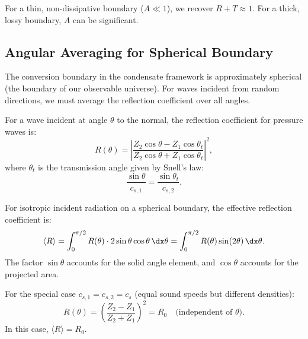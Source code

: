 For a thin, non-dissipative boundary ($A \ll 1$), we recover $R + T \approx 1$. For a thick, lossy boundary, $A$ can be significant.

\subsection{Angular Averaging for Spherical Boundary}
\label{app:angular_averaging}

The conversion boundary in the condensate framework is approximately spherical (the boundary of our observable universe). For waves incident from random directions, we must average the reflection coefficient over all angles.

\begin{proposition}
\label{prop:oblique_R}
For a wave incident at angle $\theta$ to the normal, the reflection coefficient for pressure waves is:
\begin{equation}
\label{eq:oblique_R}
R(\theta) = \left| \frac{Z_2 \cos\theta - Z_1 \cos\theta_t}{Z_2 \cos\theta + Z_1 \cos\theta_t} \right|^2,
\end{equation}
where $\theta_t$ is the transmission angle given by Snell's law:
\begin{equation}
\frac{\sin\theta}{c_{s,1}} = \frac{\sin\theta_t}{c_{s,2}}.
\end{equation}
\end{proposition}

\begin{proposition}
\label{prop:angular_average}
For isotropic incident radiation on a spherical boundary, the effective reflection coefficient is:
\begin{equation}
\label{eq:angular_average}
\langle R \rangle = \int_0^{\pi/2} R(\theta) \cdot 2 \sin\theta \cos\theta \, \dx\theta = \int_0^{\pi/2} R(\theta) \sin(2\theta) \, \dx\theta.
\end{equation}
The factor $\sin\theta$ accounts for the solid angle element, and $\cos\theta$ accounts for the projected area.
\end{proposition}

For the special case $c_{s,1} = c_{s,2} = c_s$ (equal sound speeds but different densities):
\begin{equation}
\label{eq:equal_cs_R}
R(\theta) = \left( \frac{Z_2 - Z_1}{Z_2 + Z_1} \right)^2 = R_0 \quad \text{(independent of } \theta\text{)}.
\end{equation}
In this case, $\langle R \rangle = R_0$.

